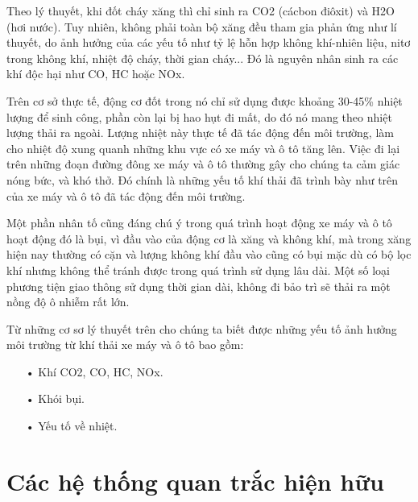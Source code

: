 Theo lý thuyết, khi đốt cháy xăng thì chỉ sinh ra CO2 (cácbon điôxit) và H2O (hơi nước). Tuy nhiên, không phải toàn bộ xăng đều tham gia phản ứng như lí thuyết, do ảnh hưởng của các yếu tố như tỷ lệ hỗn hợp không khí-nhiên liệu, nitơ trong không khí, nhiệt độ cháy, thời gian cháy... Đó là nguyên nhân sinh ra các khí độc hại như CO, HC hoặc NOx.

Trên cơ sở thực tế, động cơ đốt trong nó chỉ sử dụng được khoảng 30-45\% nhiệt lượng để sinh công, phần còn lại bị hao hụt đi mất, do đó nó mang theo nhiệt lượng thải ra ngoài. Lượng nhiệt này thực tế đã tác động đến môi trường, làm cho nhiệt độ xung quanh những khu vực có xe máy và ô tô tăng lên. Việc đi lại trên những đoạn đường đông xe máy và ô tô thường gây cho chúng ta cảm giác nóng bức, và khó thở. Đó chính là những yếu tố khí thải đã trình bày như trên của xe máy và ô tô đã tác động đến môi trường.

Một phần nhân tố cũng đáng chú ý trong quá trình hoạt động xe máy và ô tô hoạt động đó là bụi, vì đầu vào của động cơ là xăng và không khí, mà trong xăng hiện nay thường có cặn và lượng không khí đầu vào cũng có bụi mặc dù có bộ lọc khí nhưng không thể tránh được trong quá trình sử dụng lâu dài. Một số loại phương tiện giao thông sử dụng thời gian dài, không đi bảo trì sẽ thải ra một nồng độ ô nhiễm rất lớn.

Từ những cơ sơ lý thuyết trên cho chúng ta biết được những yếu tố ảnh hưởng môi trường từ khí thải xe máy và ô tô bao gồm:
\begin{itemize}
	\item[•]Khí CO2, CO, HC, NOx.
	\item[•]Khói bụi.
	\item[•]Yếu tố về nhiệt.
\end{itemize}








\section{Các hệ thống quan trắc hiện hữu}
